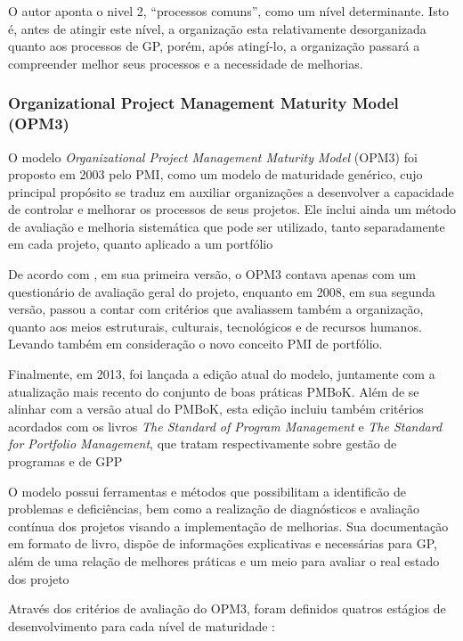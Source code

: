     O autor  aponta o nivel 2, ``processos comuns'', como um nível determinante. Isto é, antes de atingir este nível, a organização esta relativamente desorganizada quanto aos processos de GP, porém, após atingí-lo, a organização passará a compreender melhor seus processos e a necessidade de melhorias.

  \subsubsection{Organizational Project Management Maturity Model (OPM3)}

    O modelo \textit{Organizational Project Management Maturity Model} (OPM3) foi proposto em 2003 pelo PMI, como um modelo de maturidade genérico, cujo principal propósito se traduz em auxiliar organizações a desenvolver a capacidade de controlar e melhorar os processos de seus projetos. Ele inclui ainda um método de avaliação e melhoria sistemática que pode ser utilizado, tanto separadamente em cada projeto, quanto aplicado a um portfólio \cite{berssaneti2012impact}

    De acordo com , em sua primeira versão, o OPM3 contava apenas com um questionário de avaliação geral do projeto, enquanto em 2008, em sua segunda versão, passou a contar com critérios que avaliassem também a organização, quanto aos meios estruturais, culturais, tecnológicos e de recursos humanos. Levando também em consideração o novo conceito PMI de portfólio.

    Finalmente, em 2013, foi lançada a edição atual do modelo, juntamente com a atualização mais recento do conjunto de boas práticas PMBoK. Além de se alinhar com a versão atual do PMBoK, esta edição incluiu também critérios acordados com os livros \textit{The Standard of Program Management} e \textit{The Standard for Portfolio Management}, que tratam respectivamente sobre gestão de programas e de GPP \cite{pmiopm2013}

    O modelo possui ferramentas e métodos que possibilitam a identificão de problemas e deficiências, bem como a realização de diagnósticos e avaliação contínua dos projetos visando a implementação de melhorias. Sua documentação em formato de livro, dispõe de informações explicativas e necessárias para GP, além de uma relação de melhores práticas e um meio para avaliar o real estado dos projeto \cite{fahrenkrog2003project}

    Através dos critérios de avaliação do OPM3, foram definidos quatros estágios de desenvolvimento para cada nível de maturidade \cite{pmiopm2013}:

